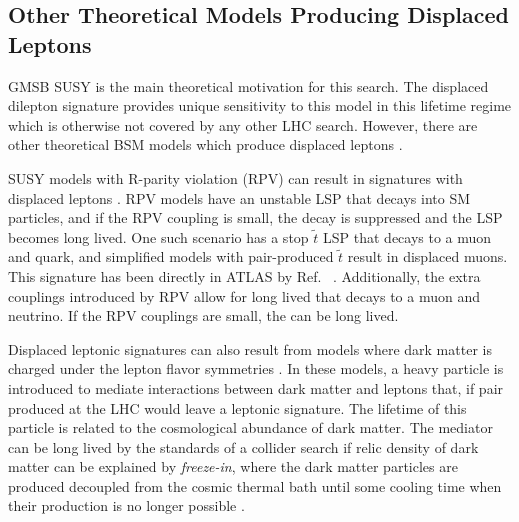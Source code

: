 \subsection{Other Theoretical Models Producing Displaced Leptons}
\label{sec:othermodels}

\ac{GMSB} \ac{SUSY} is the main theoretical motivation for this search. The displaced dilepton signature provides unique sensitivity to this model in this lifetime regime which is otherwise not covered by any other \ac{LHC} search. However, there are other theoretical \ac{BSM} models which produce displaced leptons \cite{jesseshelton}.

\ac{SUSY} models with R-parity violation (RPV) can result in signatures with displaced leptons \cite{Barbier_2005}. RPV models have an unstable \ac{LSP} that decays into \ac{SM} particles, and if the RPV coupling is small, the decay is suppressed and the \ac{LSP} becomes long lived. One such scenario has a stop $\tilde{t}$ \ac{LSP} that decays to a muon and quark, and simplified models with pair-produced $\tilde{t}$ result in displaced muons. This signature has been directly in \ac{ATLAS} by Ref. ~\cite{dvplusmu}. Additionally, the extra couplings introduced by RPV allow for long lived \stau that decays to a muon and neutrino. If the RPV couplings are small, the \stau can be long lived.

Displaced leptonic signatures can also result from models where dark matter is charged under the lepton flavor symmetries \cite{Agrawal_2012}. In these models, a heavy particle is introduced to mediate interactions between dark matter and leptons that, if pair produced at the \ac{LHC} would leave a leptonic signature. The lifetime of this particle is related to the cosmological abundance of dark matter. The mediator can be long lived by the standards of a collider search if relic density of dark matter can be explained by \emph{freeze-in}, where the dark matter particles are produced decoupled from the cosmic thermal bath until some cooling time when their production is no longer possible \cite{Hall_2010}.




